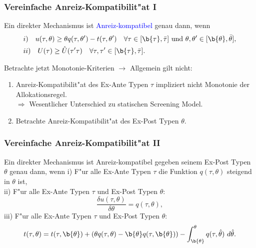 \begin{frame}
  \frametitle{Vereinfache Anreiz-Kompatibilit"at I}
  \justifying
  \begin{thmP}
    Ein direkter Mechanismus ist \textcolor{blue}{Anreiz-kompatibel} genau dann, wenn
    \begin{align*}
      &i) \quad u( \tau, \theta) \ge \theta q( \tau, \theta') - t( \tau, \theta') \quad \forall \tau \in [ \b{\tau} , \bar{\tau} ] \ \text{und} \ \theta, \theta' \in [ \b{\theta} , \bar{\theta} ], \\
      &ii) \quad U(\tau) \ge \hat{U}(\tau' \mit \tau) \quad \forall \tau, \tau' \in [ \b{\tau} , \bar{\tau} ].
    \end{align*}
  \end{thmP}
  Betrachte jetzt Monotonie-Kriterien $\rightarrow$ Allgemein gilt nicht:
  \begin{enumerate}
    \item Anreiz-Kompatibilit"at des Ex-Ante Typen $\tau$ impliziert nicht Monotonie der Allokationsregel. \\
    $\Rightarrow$ Wesentlicher Unterschied zu statischen Screening Model.
    \item Betrachte Anreiz-Kompatibilit"at des Ex-Post Typen $\theta$.
  \end{enumerate}
\end{frame}

\begin{frame}
  \frametitle{Vereinfache Anreiz-Kompatibilit"at II}
  \justifying
  \begin{thmP}
    Ein direkter Mechanismus ist Anreiz-kompatibel gegeben seinem Ex-Post Typen $\theta$ genau dann, wenn \newline \newline
    i) F"ur alle Ex-Ante Typen $\tau$ die Funktion $q(\tau, \theta)$ steigend in $\theta$ ist, \\
    ii) F"ur alle Ex-Ante Typen $\tau$ und Ex-Post Typen $\theta$:
    \begin{equation*}
      \dfrac{\delta u(\tau, \theta)}{\delta \theta} = q(\tau, \theta),
    \end{equation*}
    iii) F"ur alle Ex-Ante Typen $\tau$ und Ex-Post Typen $\theta$:
    \begin{equation*}
      t(\tau, \theta) = t(\tau, \b{\theta}) + (\theta q(\tau, \theta) - \b{\theta} q(\tau, \b{\theta})) - \int_{\b{\theta}}^{\theta} q(\tau, \hat{\theta}) \ d \hat{\theta}.
    \end{equation*}
  \end{thmP}
\end{frame}

